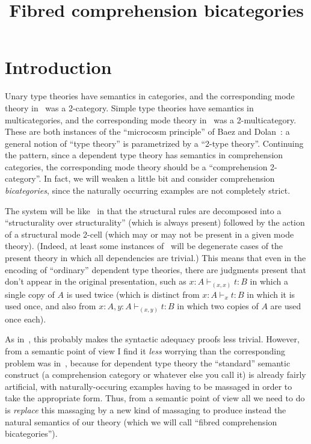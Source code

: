 \documentclass{amsart}
\title{Fibred comprehension bicategories}
\let\types\vdash
\begin{document}
\maketitle
\tableofcontents

\section{Introduction}
\label{sec:introduction}

Unary type theories have semantics in categories, and the corresponding mode theory in~\cite{ls:1var-adjoint-logic} was a 2-category.
Simple type theories have semantics in multicategories, and the corresponding mode theory in~\cite{lsr:multi} was a 2-multicategory.
These are both instances of the ``microcosm principle'' of Baez and Dolan~\cite{bd:hda3}: a general notion of ``type theory'' is parametrized by a ``2-type theory''.
Continuing the pattern, since a dependent type theory has semantics in comprehension categories, the corresponding mode theory should be a ``comprehension 2-category''.
In fact, we will weaken a little bit and consider comprehension \emph{bicategories}, since the naturally occurring examples are not completely strict.

The system will be like~\cite{lsr:multi} in that the structural rules are decomposed into a ``structurality over structurality'' (which is always present) followed by the action of a structural mode 2-cell (which may or may not be present in a given mode theory).
(Indeed, at least some instances of~\cite{lsr:multi} will be degenerate cases of the present theory in which all dependencies are trivial.)
This means that even in the encoding of ``ordinary'' dependent type theories, there are judgments present that don't appear in the original presentation, such as $x:A \types_{(x,x)} t:B$ in which a single copy of $A$ is used twice (which is distinct from $x:A \types_x t:B$ in which it is used once, and also from $x:A,y:A \types_{(x,y)} t:B$ in which two copies of $A$ are used once each).

As in~\cite{lsr:multi}, this probably makes the syntactic adequacy proofs less trivial.
However, from a semantic point of view I find it \emph{less} worrying than the corresponding problem was in~\cite{lsr:multi}, because for dependent type theory the ``standard'' semantic construct (a comprehension category or whatever else you call it) is already fairly artificial, with naturally-occuring examples having to be massaged in order to take the appropriate form.
Thus, from a semantic point of view all we need to do is \emph{replace} this massaging by a new kind of massaging to produce instead the natural semantics of our theory (which we will call ``fibred comprehension bicategories'').
\end{document}
